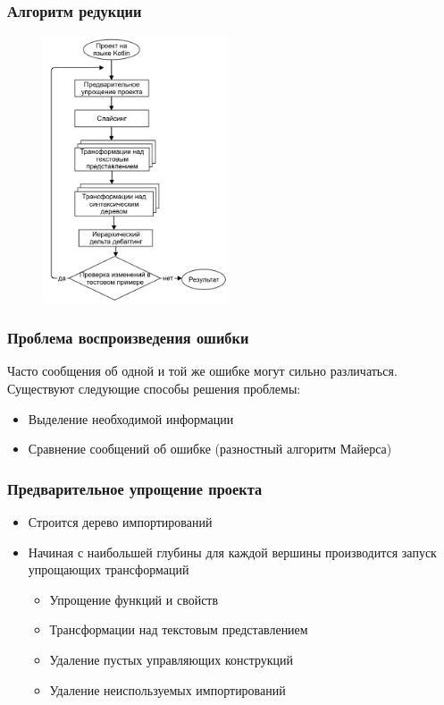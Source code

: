 \begin{frame}
	\frametitle{Алгоритм редукции}
	\begin{figure}
		\includegraphics[width=55mm]{image/scheme}
	\end{figure}	
\end{frame}


\begin{frame}
	\frametitle{Проблема воспроизведения ошибки}
		Часто сообщения об одной и той же ошибке могут сильно различаться. Существуют следующие способы решения проблемы:
		\begin{itemize}
			\item Выделение необходимой информации
			\item Сравнение сообщений об ошибке (разностный алгоритм Майерса)
		\end{itemize}
\end{frame}


\begin{frame}
	\frametitle{Предварительное упрощение проекта}
		\begin{itemize}
			\item Строится дерево импортирований
			\item Начиная с наибольшей глубины для каждой вершины производится запуск упрощающих трансформаций
				\begin{itemize}
					\item Упрощение функций и свойств
					\item Трансформации над текстовым представлением
					\item Удаление пустых управляющих конструкций
					\item Удаление неиспользуемых импортирований
				\end{itemize}
		\end{itemize}			
\end{frame}

